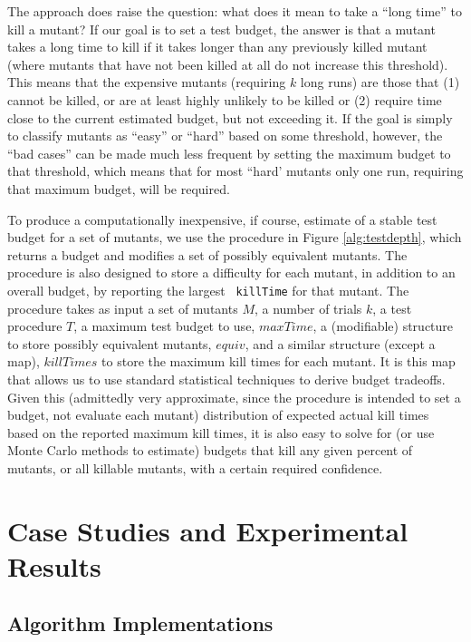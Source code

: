 \documentclass{svjour3}
\begin{document}
The approach does raise the question:  what
does it mean to take a ``long time'' to kill a mutant?  If our goal is to set a test
budget, the answer is that a mutant takes a long time to kill if it
takes longer than any previously killed mutant (where mutants that
have not been killed at all do not increase this threshold).  This
means that the expensive mutants (requiring $k$ long runs) are those
that (1) cannot be killed, or are at least highly unlikely to be
killed or (2) require time close to the current estimated
budget, but not exceeding it.  If the goal is simply to classify
mutants as ``easy'' or ``hard'' based on some threshold, however, the
``bad cases'' can be made much less frequent by setting the maximum
budget to that threshold, which means that for most ``hard' mutants
only one run, requiring that maximum budget, will be required.

To produce a computationally inexpensive, if course, estimate of a stable test
budget for a set of mutants, we use the procedure in Figure
\ref{alg:testdepth}, which returns a budget and modifies a set of
possibly equivalent mutants.  The procedure is also designed to store a
difficulty for each mutant, in addition to an overall budget, by reporting the largest {\tt
  killTime} for that mutant.  The procedure takes as input a set of
mutants $M$, a number of trials $k$, a test procedure $T$, a maximum
test budget to use, $maxTime$, a (modifiable) structure to store
possibly equivalent mutants, $equiv$, and a similar structure (except
a map), $killTimes$ to store the maximum kill times for each mutant.
It is this map that allows us to use standard statistical techniques
to derive budget tradeoffs.  Given this (admittedly very approximate, since the
procedure is intended to set a budget, not evaluate each mutant) distribution of expected actual
kill times based on the reported maximum kill times, it is also easy to
solve for (or use Monte Carlo methods to estimate) budgets that kill
any given percent of mutants, or all killable mutants, with a certain
required confidence.

\section{Case Studies and Experimental Results}

\subsection{Algorithm Implementations}
\end{document}
